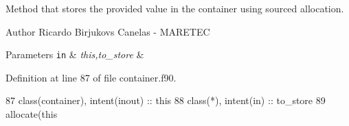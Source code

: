 Method that stores the provided value in the container using sourced allocation. 

\begin{DoxyAuthor}{Author}
Ricardo Birjukovs Canelas -\/ M\+A\+R\+E\+T\+EC 
\end{DoxyAuthor}

\begin{DoxyParams}[1]{Parameters}
\mbox{\tt in}  & {\em this,to\+\_\+store} & \\
\hline
\end{DoxyParams}


Definition at line 87 of file container.\+f90.


\begin{DoxyCode}
87     \textcolor{keywordtype}{class}(container), \textcolor{keywordtype}{intent(inout)} :: this
88     \textcolor{keywordtype}{class}(*), \textcolor{keywordtype}{intent(in)} :: to\_store
89     \textcolor{keyword}{allocate}(this%
\end{DoxyCode}
